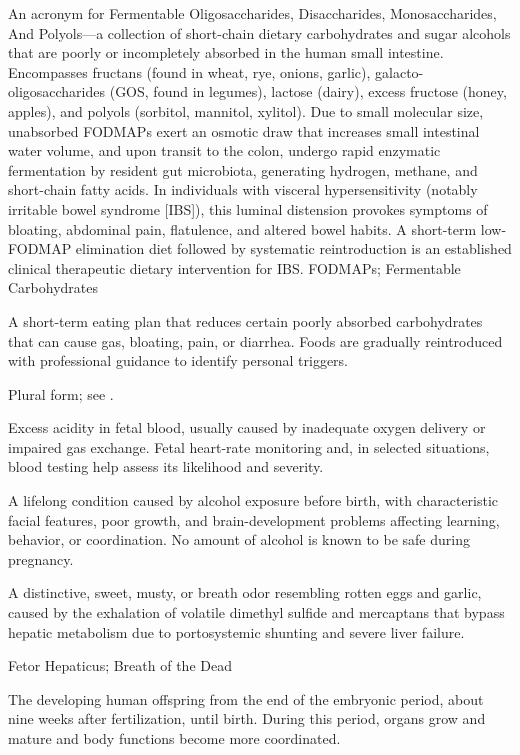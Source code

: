  An acronym for Fermentable Oligosaccharides, Disaccharides, Monosaccharides, And Polyols---a collection of short-chain dietary carbohydrates and sugar alcohols that are poorly or incompletely absorbed in the human small intestine. Encompasses fructans (found in wheat, rye, onions, garlic), galacto-oligosaccharides (GOS, found in legumes), lactose (dairy), excess fructose (honey, apples), and polyols (sorbitol, mannitol, xylitol). Due to small molecular size, unabsorbed FODMAPs exert an osmotic draw that increases small intestinal water volume, and upon transit to the colon, undergo rapid enzymatic fermentation by resident gut microbiota, generating hydrogen, methane, and short-chain fatty acids. In individuals with visceral hypersensitivity (notably irritable bowel syndrome [IBS]), this luminal distension provokes symptoms of bloating, abdominal pain, flatulence, and altered bowel habits. A short-term low-FODMAP elimination diet followed by systematic reintroduction is an established clinical therapeutic dietary intervention for IBS.
\synonyms
FODMAPs; Fermentable Carbohydrates

 A short-term eating plan that reduces certain poorly absorbed carbohydrates that can cause gas, bloating, pain, or diarrhea. Foods are gradually reintroduced with professional guidance to identify personal triggers.

 Plural form; see .

 Excess acidity in fetal blood, usually caused by inadequate oxygen delivery or impaired gas exchange. Fetal heart-rate monitoring and, in selected situations, blood testing help assess its likelihood and severity.

 A lifelong condition caused by alcohol exposure before birth, with characteristic facial features, poor growth, and brain-development problems affecting learning, behavior, or coordination. No amount of alcohol is known to be safe during pregnancy.

 A distinctive, sweet, musty, or breath odor resembling rotten eggs and garlic, caused by the exhalation of volatile dimethyl sulfide and mercaptans that bypass hepatic metabolism due to portosystemic shunting and severe liver failure.

\synonyms
Fetor Hepaticus; Breath of the Dead

 The developing human offspring from the end of the embryonic period, about nine weeks after fertilization, until birth. During this period, organs grow and mature and body functions become more coordinated.

